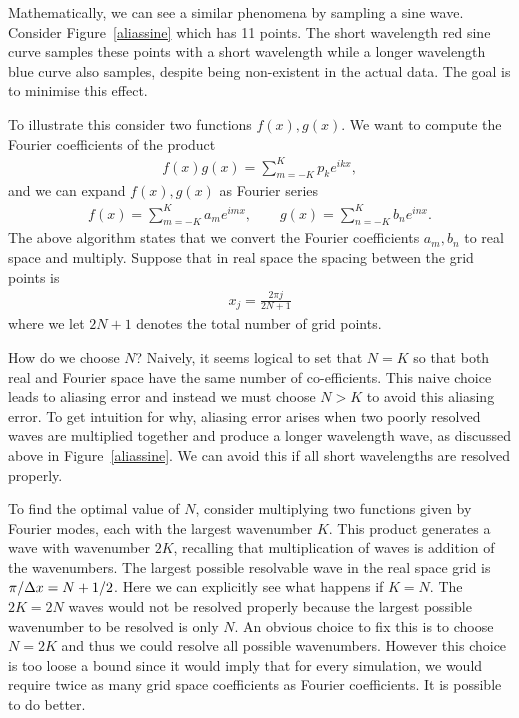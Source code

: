 Mathematically, we can see a similar phenomena by sampling a sine wave. Consider Figure~\ref{aliassine} which has 11 points. The short wavelength red sine curve samples these points with a short wavelength while a longer wavelength blue curve also samples, despite being non-existent in the actual data. The goal is to minimise this effect. 

To illustrate this consider two functions $f(x),g(x)$. We want to compute the Fourier coefficients of the product
\begin{align}
f(x)g(x) = \sum_{m=-K}^{K} p_{k}e^{ikx},
\end{align}
and we can expand $f(x),g(x)$ as Fourier series
\begin{align}
f(x) = \sum_{m=-K}^{K}a_{m}e^{imx}, \qquad g(x) = \sum_{n=-K}^{K}b_{n}e^{inx}.
\end{align}
The above algorithm states that we convert the Fourier coefficients $a_{m},b_{n}$ to real space and multiply. Suppose that in real space the spacing between the grid points is
\begin{align}
x_{j} = \frac{2\pi j}{2N+1}
\end{align}
where we let $2N+1$ denotes the total number of grid points. 

How do we choose $N$? Naively, it seems logical to set that $N=K$ so that both real and Fourier space have the same number of co-efficients. This naive choice leads to aliasing error and instead we must choose $N>K$ to avoid this aliasing error. To get intuition for why, aliasing error arises when two poorly resolved waves are multiplied together and produce a longer wavelength wave, as discussed above in Figure~\ref{aliassine}. We can avoid this if all short wavelengths are resolved properly.

To find the optimal value of $N$, consider multiplying two functions given by Fourier modes, each with the largest wavenumber $K$. This product generates a wave with wavenumber $2K$, recalling that multiplication of waves is addition of the wavenumbers. The largest possible resolvable wave in the real space grid is $\pi/\Delta x=N+1/2$. Here we can explicitly see what happens if $K=N$. The $2K=2N$ waves would not be resolved properly because the largest possible wavenumber to be resolved is only $N$. An obvious choice to fix this is to choose $N=2K$ and thus we could resolve all possible wavenumbers. However this choice is too loose a bound since it would imply that for every simulation, we would require twice as many grid space coefficients as Fourier coefficients. It is possible to do better. 

